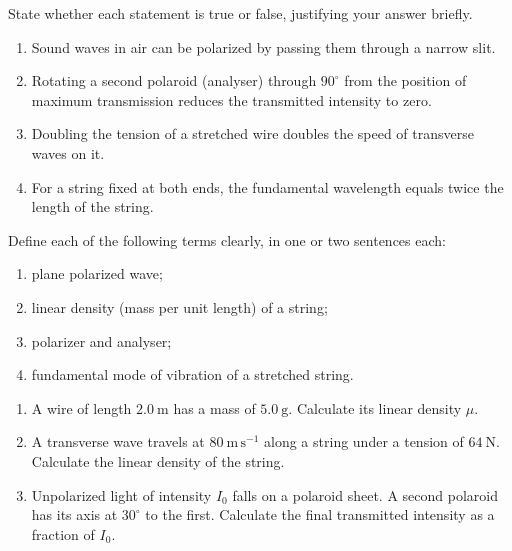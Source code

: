 \documentclass[11pt]{article}
\newcounter{popsec}
\newcounter{popsub}
\newcommand{\courssub}[1]{%
  \stepcounter{popsub}%
  \par\vspace{9pt}\noindent{\popxbold\fontsize{11.5}{13}\selectfont\color{popink}{\color{poporange}\thepopsec.\thepopsub}\hspace{6pt}#1}\par\nopagebreak\vspace{4pt}
}
\begin{document}
\begin{exercice}
State whether each statement is true or false, justifying your answer briefly.
\begin{enumerate}
\item Sound waves in air can be polarized by passing them through a narrow slit.
\item Rotating a second polaroid (analyser) through $90^{\circ}$ from the position of maximum transmission reduces the transmitted intensity to zero.
\item Doubling the tension of a stretched wire doubles the speed of transverse waves on it.
\item For a string fixed at both ends, the fundamental wavelength equals twice the length of the string.
\end{enumerate}
\end{exercice}

\begin{exercice}[Definitions]
Define each of the following terms clearly, in one or two sentences each:
\begin{enumerate}
\item plane polarized wave;
\item linear density (mass per unit length) of a string;
\item polarizer and analyser;
\item fundamental mode of vibration of a stretched string.
\end{enumerate}
\end{exercice}

\begin{exercice}
\begin{enumerate}
\item A wire of length $2.0\ \mathrm{m}$ has a mass of $5.0\ \mathrm{g}$. Calculate its linear density $\mu$.
\item A transverse wave travels at $80\ \mathrm{m\,s^{-1}}$ along a string under a tension of $64\ \mathrm{N}$. Calculate the linear density of the string.
\item Unpolarized light of intensity $I_0$ falls on a polaroid sheet. A second polaroid has its axis at $30^{\circ}$ to the first. Calculate the final transmitted intensity as a fraction of $I_0$.
\end{enumerate}
\end{exercice}

\courssub{I practise}
\end{document}
